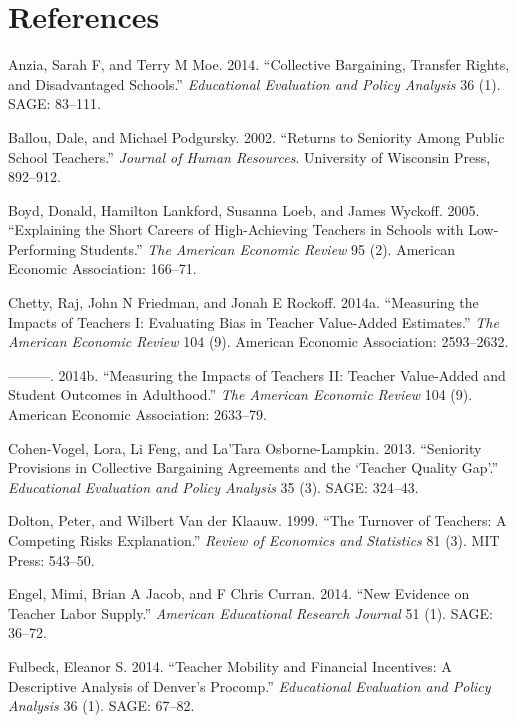\documentclass[]{article}
\begin{document}
\section*{References}\label{references}

\hypertarget{refs}{}
\hypertarget{ref-anzia}{}
Anzia, Sarah F, and Terry M Moe. 2014. ``Collective Bargaining, Transfer
Rights, and Disadvantaged Schools.'' \emph{Educational Evaluation and
Policy Analysis} 36 (1). SAGE: 83--111.

\hypertarget{ref-ballou}{}
Ballou, Dale, and Michael Podgursky. 2002. ``Returns to Seniority Among
Public School Teachers.'' \emph{Journal of Human Resources}. University
of Wisconsin Press, 892--912.

\hypertarget{ref-boyd}{}
Boyd, Donald, Hamilton Lankford, Susanna Loeb, and James Wyckoff. 2005.
``Explaining the Short Careers of High-Achieving Teachers in Schools
with Low-Performing Students.'' \emph{The American Economic Review} 95
(2). American Economic Association: 166--71.

\hypertarget{ref-chettyI}{}
Chetty, Raj, John N Friedman, and Jonah E Rockoff. 2014a. ``Measuring
the Impacts of Teachers I: Evaluating Bias in Teacher Value-Added
Estimates.'' \emph{The American Economic Review} 104 (9). American
Economic Association: 2593--2632.

\hypertarget{ref-chettyII}{}
---------. 2014b. ``Measuring the Impacts of Teachers II: Teacher
Value-Added and Student Outcomes in Adulthood.'' \emph{The American
Economic Review} 104 (9). American Economic Association: 2633--79.

\hypertarget{ref-cohenvogel}{}
Cohen-Vogel, Lora, Li Feng, and La'Tara Osborne-Lampkin. 2013.
``Seniority Provisions in Collective Bargaining Agreements and the
`Teacher Quality Gap'.'' \emph{Educational Evaluation and Policy
Analysis} 35 (3). SAGE: 324--43.

\hypertarget{ref-dolton}{}
Dolton, Peter, and Wilbert Van der Klaauw. 1999. ``The Turnover of
Teachers: A Competing Risks Explanation.'' \emph{Review of Economics and
Statistics} 81 (3). MIT Press: 543--50.

\hypertarget{ref-engel}{}
Engel, Mimi, Brian A Jacob, and F Chris Curran. 2014. ``New Evidence on
Teacher Labor Supply.'' \emph{American Educational Research Journal} 51
(1). SAGE: 36--72.

\hypertarget{ref-fulbeck}{}
Fulbeck, Eleanor S. 2014. ``Teacher Mobility and Financial Incentives: A
Descriptive Analysis of Denver's Procomp.'' \emph{Educational Evaluation
and Policy Analysis} 36 (1). SAGE: 67--82.
\end{document}
